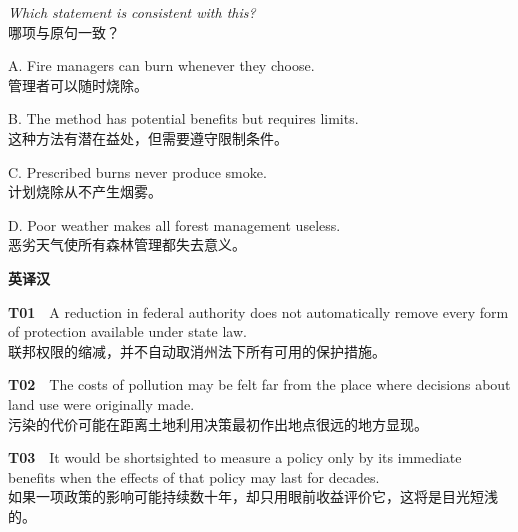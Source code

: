 \documentclass[a4paper,11pt,openany]{report}
\newcommand{\zhline}[1]{{\CJKsf\color{bodygrey}#1}}
\begin{document}
\begin{samepage}
\emph{Which statement is consistent with this?}\\
\zhline{哪项与原句一致？}
\par\end{samepage}

\begin{samepage}
A. Fire managers can burn whenever they choose.\\
\zhline{管理者可以随时烧除。}
\par\end{samepage}

\begin{samepage}
B. The method has potential benefits but requires limits.\\
\zhline{这种方法有潜在益处，但需要遵守限制条件。}
\par\end{samepage}

\begin{samepage}
C. Prescribed burns never produce smoke.\\
\zhline{计划烧除从不产生烟雾。}
\par\end{samepage}

\begin{samepage}
D. Poor weather makes all forest management useless.\\
\zhline{恶劣天气使所有森林管理都失去意义。}
\par\end{samepage}

\textbf{英译汉}

\begin{samepage}
\textbf{T01}　A reduction in federal authority does not automatically remove every form of protection available under state law.\\
\zhline{联邦权限的缩减，并不自动取消州法下所有可用的保护措施。}
\par\end{samepage}

\begin{samepage}
\textbf{T02}　The costs of pollution may be felt far from the place where decisions about land use were originally made.\\
\zhline{污染的代价可能在距离土地利用决策最初作出地点很远的地方显现。}
\par\end{samepage}

\begin{samepage}
\textbf{T03}　It would be shortsighted to measure a policy only by its immediate benefits when the effects of that policy may last for decades.\\
\zhline{如果一项政策的影响可能持续数十年，却只用眼前收益评价它，这将是目光短浅的。}
\par\end{samepage}
\end{document}

